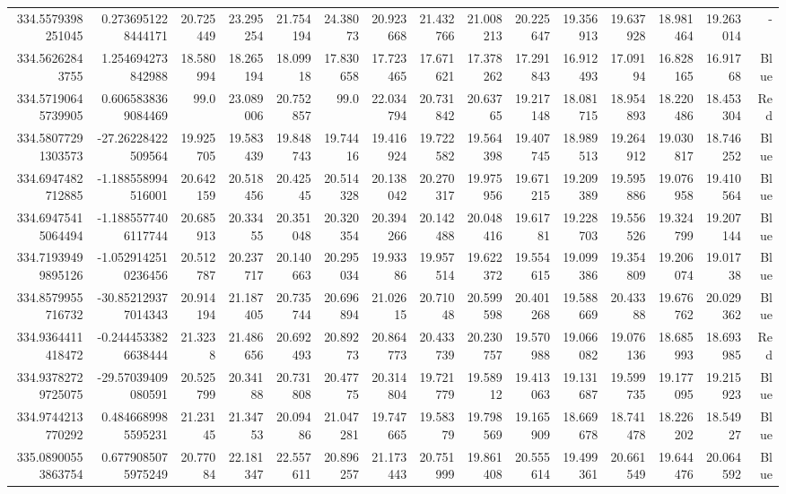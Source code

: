 \begin{center}
\begin{longtable}{rrrrrrrrrrrrrrr}
334.5579398251045 & 0.2736951228444171 & 20.725449 & 23.295254 & 21.754194 & 24.38073 & 20.923668 & 21.432766 & 21.008213 & 20.225647 & 19.356913 & 19.637928 & 18.981464 & 19.263014 & - \\
334.56262843755 & 1.254694273842988 & 18.580994 & 18.265194 & 18.09918 & 17.830658 & 17.723465 & 17.671621 & 17.378262 & 17.291843 & 16.912493 & 17.09194 & 16.828165 & 16.91768 & Blue \\
334.57190645739905 & 0.6065838369084469 & 99.0 & 23.089006 & 20.752857 & 99.0 & 22.034794 & 20.731842 & 20.63765 & 19.217148 & 18.081715 & 18.954893 & 18.220486 & 18.453304 & Red \\
334.58077291303573 & -27.26228422509564 & 19.925705 & 19.583439 & 19.848743 & 19.74416 & 19.416924 & 19.722582 & 19.564398 & 19.407745 & 18.989513 & 19.264912 & 19.030817 & 18.746252 & Blue \\
334.6947482712885 & -1.188558994516001 & 20.642159 & 20.518456 & 20.42545 & 20.514328 & 20.138042 & 20.270317 & 19.975956 & 19.671215 & 19.209389 & 19.595886 & 19.076958 & 19.410564 & Blue \\
334.69475415064494 & -1.1885577406117744 & 20.685913 & 20.33455 & 20.351048 & 20.320354 & 20.394266 & 20.142488 & 20.048416 & 19.61781 & 19.228703 & 19.556526 & 19.324799 & 19.207144 & Blue \\
334.71939499895126 & -1.0529142510236456 & 20.512787 & 20.237717 & 20.140663 & 20.295034 & 19.93386 & 19.957514 & 19.622372 & 19.554615 & 19.099386 & 19.354809 & 19.206074 & 19.01738 & Blue \\
334.8579955716732 & -30.852129377014343 & 20.914194 & 21.187405 & 20.735744 & 20.696894 & 21.02615 & 20.71048 & 20.599598 & 20.401268 & 19.588669 & 20.43388 & 19.676762 & 20.029362 & Blue \\
334.9364411418472 & -0.2444533826638444 & 21.3238 & 21.486656 & 20.692493 & 20.89273 & 20.864773 & 20.433739 & 20.230757 & 19.570988 & 19.066082 & 19.076136 & 18.685993 & 18.693985 & Red \\
334.93782729725075 & -29.57039409080591 & 20.525799 & 20.34188 & 20.731808 & 20.47775 & 20.314804 & 19.721779 & 19.58912 & 19.413063 & 19.131687 & 19.599735 & 19.177095 & 19.215923 & Blue \\
334.9744213770292 & 0.4846689985595231 & 21.23145 & 21.34753 & 20.09486 & 21.047281 & 19.747665 & 19.58379 & 19.798569 & 19.165909 & 18.669678 & 18.741478 & 18.226202 & 18.54927 & Blue \\
335.08900553863754 & 0.6779085075975249 & 20.77084 & 22.181347 & 22.557611 & 20.896257 & 21.173443 & 20.751999 & 19.861408 & 20.555614 & 19.499361 & 20.661549 & 19.644476 & 20.064592 & Blue \\

\end{longtable}
\end{center}

